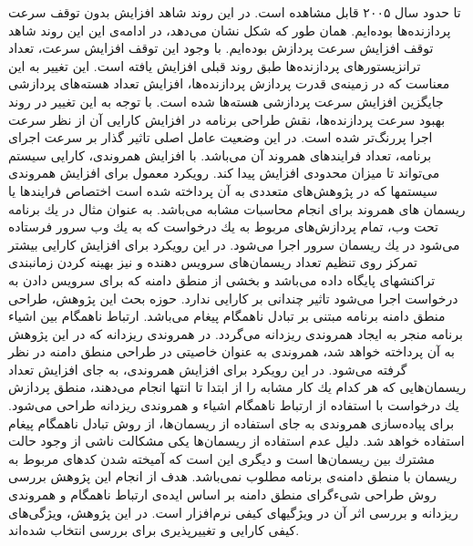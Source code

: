 تا حدود سال ۲۰۰۵ قابل مشاهده است. در این روند شاهد افزایش بدون توقف سرعت پردازنده‌ها بوده‌ایم. همان طور که شکل نشان می‌دهد، در ادامه‌ی این این روند شاهد توقف افزایش سرعت پردازش بوده‌ایم. با وجود این توقف افزایش سرعت، تعداد ترانزیستور‌های پردازنده‌ها طبق روند قبلی افزایش یافته است. این تغییر به این معناست که در زمینه‌ی قدرت پردازش پردازنده‌ها، افزایش تعداد هسته‌های پردازشی جایگزین افزایش سرعت پردازشی هسته‌ها شده است. با توجه به این تغییر در روند بهبود سرعت پردازنده‌ها، نقش طراحی برنامه در افزایش كارایی آن از نظر سرعت اجرا پررنگ‌تر شده است. در این وضعیت عامل اصلی تاثیر گذار بر سرعت اجرای برنامه، تعداد فرایندهای همروند آن می‌باشد. با افزایش همروندی، كارایی سیستم می‌تواند تا میزان محدودی افزایش پیدا کند. رویكرد معمول برای افزایش همروندی سیستمها كه در پژوهش‌های متعددی به آن پرداخته شده است اختصاص فرایندها یا ریسمان های همروند برای انجام محاسبات مشابه می‌باشد. به عنوان مثال در یك برنامه تحت وب، تمام پردازش‌های مربوط به یك درخواست كه به یك وب سرور فرستاده می‌شود در یك ریسمان سرور اجرا می‌شود. در این رویكرد برای افزایش كارایی بیشتر تمركز روی تنظیم تعداد ریسمان‌های سرویس دهنده و نیز بهینه كردن زمانبندی تراكنشهای پایگاه داده می‌باشد و بخشی از منطق دامنه كه برای سرویس دادن به درخواست اجرا می‌شود تاثیر چندانی بر كارایی ندارد. حوزه بحث این پژوهش، طراحی منطق دامنه برنامه مبتنی بر تبادل ناهمگام پیغام می‌باشد. ارتباط ناهمگام بین اشیاء برنامه منجر به ایجاد همروندی ریزدانه می‌گردد. در همروندی ریزدانه كه در این پژوهش به آن پرداخته خواهد شد، همروندی به عنوان خاصیتی در طراحی منطق دامنه در نظر گرفته می‌شود. در این رویكرد برای افزایش همروندی، به جای افزایش تعداد ریسمان‌هایی كه هر كدام یك كار مشابه را از ابتدا تا انتها انجام می‌دهند، منطق پردازش یك درخواست با استفاده از ارتباط ناهمگام اشیاء و همروندی ریزدانه طراحی می‌شود. برای پیاده‌سازی همروندی به جای استفاده از ریسمان‌ها، از روش تبادل ناهمگام پیغام استفاده خواهد شد. دلیل عدم استفاده از ریسمان‌ها یكی مشكالت ناشی از وجود حالت مشترك 
بین ریسمان‌ها است و دیگری این است كه آمیخته شدن كدهای مربوط به ریسمان با منطق دامنه‌ی برنامه مطلوب نمی‌باشد. هدف از انجام این پژوهش بررسی روش طراحی شیءگرای منطق دامنه بر اساس ایده‌ی ارتباط ناهمگام و همروندی ریزدانه و بررسی اثر آن در ویژگیهای كیفی نرم‌افزار است. در این پژوهش، ویژگی‌های كیفی كارایی
و تغییرپذیری
برای بررسی انتخاب شده‌اند.

